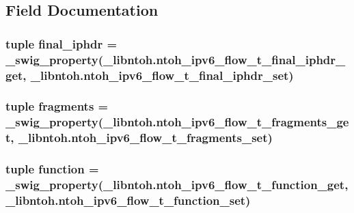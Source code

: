 \subsection{Field Documentation}
\hypertarget{classlibntoh_1_1ntoh__ipv6__flow__t_aaae262685d5063d60668907a4beaf956}{
\subsubsection[{final\-\_\-iphdr}]{\setlength{\rightskip}{0pt plus 5cm}tuple final\-\_\-iphdr = {\bf \-\_\-swig\-\_\-property}(\-\_\-libntoh.\-ntoh\-\_\-ipv6\-\_\-flow\-\_\-t\-\_\-final\-\_\-iphdr\-\_\-get, \-\_\-libntoh.\-ntoh\-\_\-ipv6\-\_\-flow\-\_\-t\-\_\-final\-\_\-iphdr\-\_\-set)\hspace{0.3cm}{\ttfamily [static]}}}\label{classlibntoh_1_1ntoh__ipv6__flow__t_aaae262685d5063d60668907a4beaf956}
\hypertarget{classlibntoh_1_1ntoh__ipv6__flow__t_a61a562f6a662704721df2bd666792d24}{
\subsubsection[{fragments}]{\setlength{\rightskip}{0pt plus 5cm}tuple fragments = {\bf \-\_\-swig\-\_\-property}(\-\_\-libntoh.\-ntoh\-\_\-ipv6\-\_\-flow\-\_\-t\-\_\-fragments\-\_\-get, \-\_\-libntoh.\-ntoh\-\_\-ipv6\-\_\-flow\-\_\-t\-\_\-fragments\-\_\-set)\hspace{0.3cm}{\ttfamily [static]}}}\label{classlibntoh_1_1ntoh__ipv6__flow__t_a61a562f6a662704721df2bd666792d24}
\hypertarget{classlibntoh_1_1ntoh__ipv6__flow__t_a543077174a1281b9d00884a11a040629}{
\subsubsection[{function}]{\setlength{\rightskip}{0pt plus 5cm}tuple function = {\bf \-\_\-swig\-\_\-property}(\-\_\-libntoh.\-ntoh\-\_\-ipv6\-\_\-flow\-\_\-t\-\_\-function\-\_\-get, \-\_\-libntoh.\-ntoh\-\_\-ipv6\-\_\-flow\-\_\-t\-\_\-function\-\_\-set)\hspace{0.3cm}{\ttfamily [static]}}}\label{classlibntoh_1_1ntoh__ipv6__flow__t_a543077174a1281b9d00884a11a040629}
